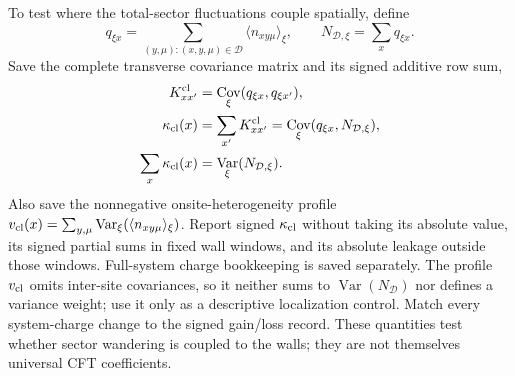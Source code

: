 \documentclass[aps,prx,twocolumn,floatfix,nofootinbib,superscriptaddress,longbibliography]{revtex4-2}
\DeclareMathOperator{\Var}{Var}
\DeclareMathOperator{\Cov}{Cov}
\begin{document}
To test where the total-sector fluctuations couple spatially, define
\begin{equation}
 q_{\xi x}=\sum_{(y,\mu):(x,y,\mu)\in\mathcal D}
 \langle n_{xy\mu}\rangle_\xi,
 \qquad N_{\mathcal D,\xi}=\sum_xq_{\xi x}.
\end{equation}
Save the complete transverse covariance matrix and its signed additive row sum,
\begin{equation}
 \begin{aligned}
 K_{xx'}^{\rm cl}&=\Cov_\xi(q_{\xi x},q_{\xi x'}),\\
 \kappa_{\rm cl}(x)&=\sum_{x'}K_{xx'}^{\rm cl}
 =\Cov_\xi(q_{\xi x},N_{\mathcal D,\xi}),\\
 \sum_x\kappa_{\rm cl}(x)&=\Var_\xi(N_{\mathcal D,\xi}).
 \end{aligned}
 \label{eq:classical-charge-profile}
\end{equation}
Also save the nonnegative onsite-heterogeneity profile
$v_{\rm cl}(x)=\sum_{y,\mu}\Var_\xi(\langle n_{xy\mu}\rangle_\xi)$.
Report signed $\kappa_{\rm cl}$ without taking its absolute value, its signed partial sums
in fixed wall windows, and its absolute leakage outside those windows.  Full-system charge
bookkeeping is saved separately.  The profile $v_{\rm cl}$ omits inter-site covariances, so
it neither sums to $\Var(N_{\mathcal D})$ nor defines a variance weight; use it only as a
descriptive localization control.  Match every system-charge change to the signed
gain/loss record.  These quantities test whether sector wandering is coupled to the walls;
they are not themselves universal CFT coefficients.
\end{document}
